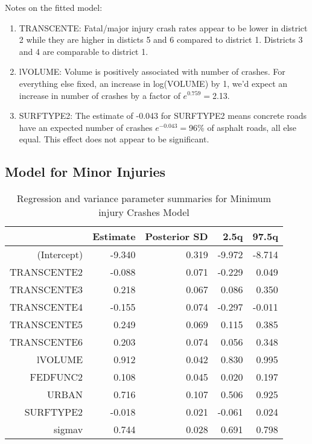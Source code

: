 \documentclass[a4paper]{article}\usepackage[]{graphicx}\usepackage[]{color}
\begin{document}
Notes on the fitted model:

\begin{enumerate}
\item
TRANSCENTE: Fatal/major injury crash rates appear to be lower in district 2 while they are higher in disticts 5 and 6 compared to district 1. Districts 3 and 4 are comparable to district 1.

\item
lVOLUME: Volume is positively associated with number of crashes. For everything else fixed, an increase in log(VOLUME) by 1, we'd expect an increase in number of crashes by a factor of $e^{0.759}=$2.13.

\item
SURFTYPE2: The estimate of -0.043 for SURFTYPE2 means concrete roads have an expected number of crashes $e^{-0.043}=$96\% of asphalt roads, all else equal. This effect does not appear to be significant.

\end{enumerate}


\clearpage
\subsection{Model for Minor Injuries}

\begin{table}[ht]
\centering
\begin{tabular}{rrrrr}
  \hline
 & Estimate & Posterior SD & 2.5q & 97.5q \\ 
  \hline
(Intercept) & -9.340 & 0.319 & -9.972 & -8.714 \\ 
  TRANSCENTE2 & -0.088 & 0.071 & -0.229 & 0.049 \\ 
  TRANSCENTE3 & 0.218 & 0.067 & 0.086 & 0.350 \\ 
  TRANSCENTE4 & -0.155 & 0.074 & -0.297 & -0.011 \\ 
  TRANSCENTE5 & 0.249 & 0.069 & 0.115 & 0.385 \\ 
  TRANSCENTE6 & 0.203 & 0.074 & 0.056 & 0.348 \\ 
  lVOLUME & 0.912 & 0.042 & 0.830 & 0.995 \\ 
  FEDFUNC2 & 0.108 & 0.045 & 0.020 & 0.197 \\ 
  URBAN & 0.716 & 0.107 & 0.506 & 0.925 \\ 
  SURFTYPE2 & -0.018 & 0.021 & -0.061 & 0.024 \\ 
  sigmav & 0.744 & 0.028 & 0.691 & 0.798 \\ 
   \hline
\end{tabular}
\caption{Regression and variance parameter summaries for Minimum injury Crashes Model} 
\label{mincrash}
\end{table}
\end{document}
